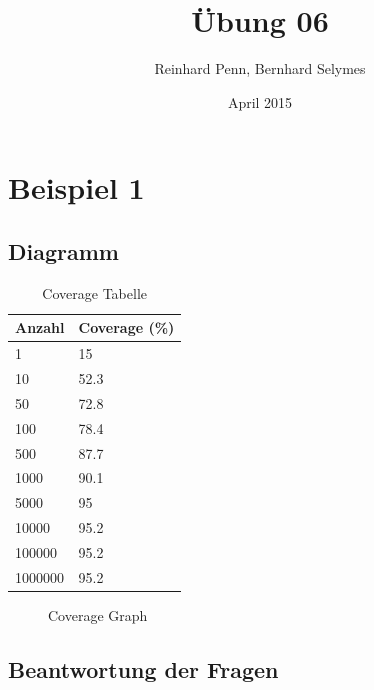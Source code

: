 \documentclass[12pt,a4paper]{article}
\begin{document}
\title{Übung 06}
\author{Reinhard Penn, Bernhard Selymes}
\date{April 2015}

\normalsize


\newcommand{\Uebung}{Random}
\newcommand{\srcpath}{../../src}
\newcommand{\simpath}{../../sim}



\section{Beispiel 1}

\subsection{Diagramm}

\begin{table}[H]
\centering
\begin{tabular}{|l|l|}
\hline
Anzahl  & Coverage (\%) \\ \hline
1       & 15   \\ \hline
10      & 52.3 \\ \hline
50      & 72.8 \\ \hline
100     & 78.4 \\ \hline
500     & 87.7 \\ \hline
1000    & 90.1 \\ \hline
5000    & 95   \\ \hline
10000   & 95.2 \\ \hline
100000  & 95.2 \\ \hline
1000000 & 95.2 \\ \hline
\end{tabular}
\caption{Coverage Tabelle}
\end{table}

\begin{figure}[ht!]
\centering
	\caption{Coverage Graph \label{overflow}}
\end{figure}

\subsection{Beantwortung der Fragen}
\end{document}
